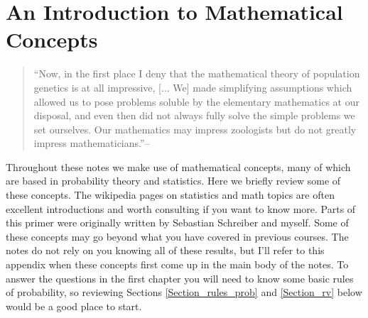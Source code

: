 % 
% 
% 




\chapter{An Introduction to Mathematical Concepts}
\begin{quote}
``Now, in the first place I deny that the mathematical theory of
population genetics is at all impressive, [... We] made simplifying assumptions which allowed us to pose problems
soluble by the elementary mathematics at our disposal, and even then
did not always fully solve the simple problems we set ourselves. Our
mathematics may impress zoologists but do not greatly impress
mathematicians.''--\citeauthor{haldane1964defense} 
\end{quote}

Throughout these notes we make use of mathematical concepts, many of
which are based in probability theory and statistics. Here we briefly
review some of these concepts. The wikipedia pages on
statistics and math topics are often excellent introductions and
worth consulting if you want to know more. Parts of this primer were originally written by
Sebastian Schreiber and myself.
Some of these concepts may go beyond what you have covered in previous
courses. The notes do not rely on you knowing all of these results, but I'll refer to this appendix when these concepts first come
up in the main body of the notes. To answer the questions in the first
chapter you will need to know some basic rules of probability, so
reviewing Sections \ref{Section_rules_prob} and \ref{Section_rv} below
would be  a good place to start.

